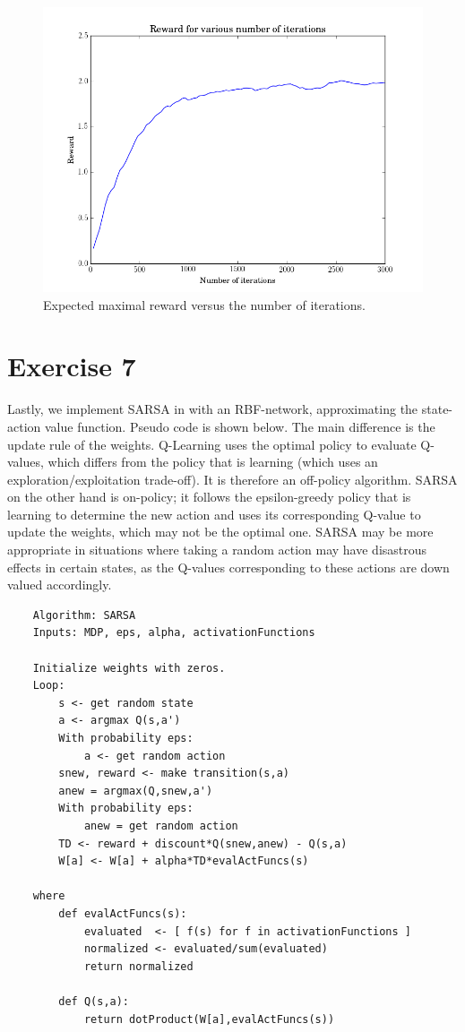 \documentclass [a4paper] {report}
\begin{document}
	\begin{figure}[H]
		\begin{center}
			\includegraphics[scale=0.4]{Images/expected_return01.png}
			\caption{Expected maximal reward versus the number of iterations.}
			\label{reward}
		\end{center}
	\end{figure}
	
	\newpage
	\section*{Exercise 7}
	Lastly, we implement SARSA in with an RBF-network, approximating the state-action value function. Pseudo code is shown below. The main difference is the update rule of the weights. Q-Learning uses the optimal policy to evaluate Q-values, which differs from the policy that is learning (which uses an exploration/exploitation trade-off). It is therefore an off-policy algorithm. SARSA on the other hand is on-policy; it follows the epsilon-greedy policy that is learning to determine the new action and uses its corresponding Q-value to update the weights, which may not be the optimal one. SARSA may be more appropriate in situations where taking a random action may have disastrous effects in certain states, as the Q-values corresponding to these actions are down valued accordingly.
	
	\begin{lstlisting}
	Algorithm: SARSA
	Inputs: MDP, eps, alpha, activationFunctions
	
	Initialize weights with zeros.
	Loop:
		s <- get random state
		a <- argmax Q(s,a')
		With probability eps:
			a <- get random action
		snew, reward <- make transition(s,a)
		anew = argmax(Q,snew,a')
		With probability eps:
			anew = get random action
		TD <- reward + discount*Q(snew,anew) - Q(s,a)
		W[a] <- W[a] + alpha*TD*evalActFuncs(s)
	
	where
		def evalActFuncs(s):
			evaluated  <- [ f(s) for f in activationFunctions ]
			normalized <- evaluated/sum(evaluated)
			return normalized
		
		def Q(s,a):
			return dotProduct(W[a],evalActFuncs(s)) 	
	\end{lstlisting}
		
\end{document}
